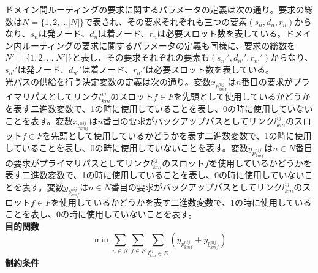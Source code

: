 \documentclass[a4j,twocolumn,fleqn]{jarticle}
\begin{document}
ドメイン間ルーティングの要求に関するパラメータの定義は次の通り。要求の総数は$N=\{1,2,\dots |N|\}$で表され、その要求それぞれも三つの要素$(s_n,d_n,r_n)$からなり、$s_n$は発ノード、$d_n$は着ノード、$r_n$は必要スロット数を表している。ドメイン内ルーティングの要求に関するパラメータの定義も同様に、要求の総数を$N'=\{1,2,\dots |N'|\}$と表し、その要求それぞれの要素も$(s_{n'}',d_{n'}',r_{n'}')$からなり、$s_{n'}'$は発ノード、$d_{n'}'$は着ノード、$r_{n'}'$は必要スロット数を表している。\\
光パスの供給を行う決定変数の定義は次の通り。変数$x_{p^{nij}_{kmf}}$は$n$番目の要求がプライマリパスとしてリンク$l^{ij}_{km}$のスロット$f \in F$を先頭として使用しているかどうかを表す二進数変数で、1の時に使用していることを表し、0の時に使用していないことを表す。変数$x_{b^{nij}_{kmf}}$は$n$番目の要求がバックアップパスとしてリンク$l^{ij}_{km}$のスロット$f\in F$を先頭として使用しているかどうかを表す二進数変数で、1の時に使用していることを表し、0の時に使用していないことを表す。変数$y_{p^{nij}_{kmf}}$は$n\in N$番目の要求がプライマリパスとしてリンク$l^{ij}_{km}$のスロット$f$を使用しているかどうかを表す二進数変数で、1の時に使用していることを表し、0の時に使用していないことを表す。変数$y_{b^{nij}_{kmf}}$は$n\in N$番目の要求がバックアップパスとしてリンク$l^{ij}_{km}$のスロット$f\in F$を使用しているかどうかを表す二進数変数で、1の時に使用していることを表し、0の時に使用していないことを表す。\\
{\large \bf 目的関数}
\begin{equation}%
\displaystyle \min \sum_{n \in N} \sum_{f \in F} \sum_{l^{ij}_{km} \in E}(y_{p^{nij}_{kmf}} + y_{b^{nij}_{kmf}})
\end{equation}
{\large \bf 制約条件}
\end{document}
